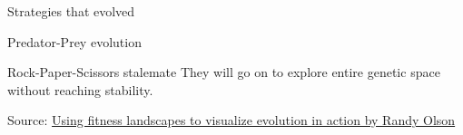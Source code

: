 \documentclass{beamer}
\begin{document}
\begin{frame}{Strategies that evolved}
\end{frame}

\begin{frame}{Predator-Prey evolution}
\end{frame}

\begin{frame}{Rock-Paper-Scissors stalemate}
They will go on to explore entire genetic space without reaching stability.
\end{frame}
\begin{frame}
    Source: \href{https://www.youtube.com/watch?v=4pdiAneMMhU}{Using fitness landscapes to visualize evolution in action by Randy Olson}

\end{frame}
\end{document}
